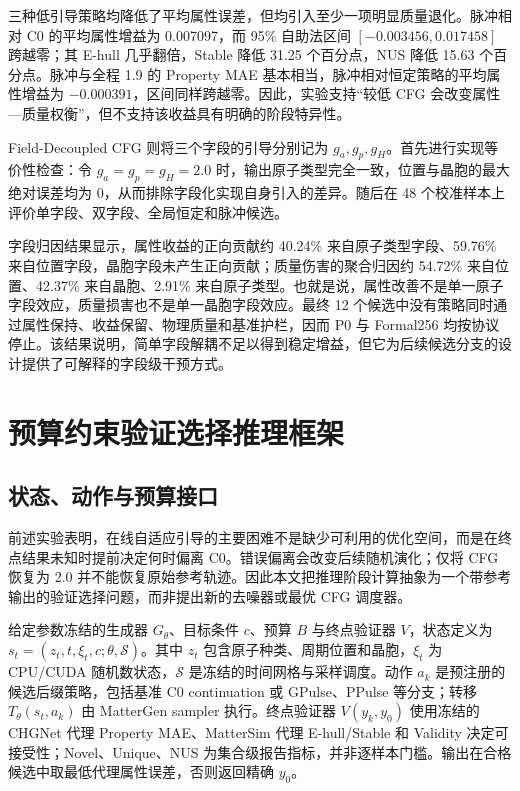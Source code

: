 三种低引导策略均降低了平均属性误差，但均引入至少一项明显质量退化。脉冲相对 C0 的平均属性增益为 0.007097，而 95\% 自助法区间 \([-0.003456,0.017458]\) 跨越零；其 E-hull 几乎翻倍，Stable 降低 31.25 个百分点，NUS 降低 15.63 个百分点。脉冲与全程 1.9 的 Property MAE 基本相当，脉冲相对恒定策略的平均属性增益为 \(-0.000391\)，区间同样跨越零。因此，实验支持``较低 CFG 会改变属性---质量权衡''，但不支持该收益具有明确的阶段特异性。

Field-Decoupled CFG 则将三个字段的引导分别记为 \(g_a,g_p,g_H\)。首先进行实现等价性检查：令 \(g_a=g_p=g_H=2.0\) 时，输出原子类型完全一致，位置与晶胞的最大绝对误差均为 0，从而排除字段化实现自身引入的差异。随后在 48 个校准样本上评价单字段、双字段、全局恒定和脉冲候选。

字段归因结果显示，属性收益的正向贡献约 40.24\% 来自原子类型字段、59.76\% 来自位置字段，晶胞字段未产生正向贡献；质量伤害的聚合归因约 54.72\% 来自位置、42.37\% 来自晶胞、2.91\% 来自原子类型。也就是说，属性改善不是单一原子字段效应，质量损害也不是单一晶胞字段效应。最终 12 个候选中没有策略同时通过属性保持、收益保留、物理质量和基准护栏，因而 P0 与 Formal256 均按协议停止。该结果说明，简单字段解耦不足以得到稳定增益，但它为后续候选分支的设计提供了可解释的字段级干预方式。

\section{预算约束验证选择推理框架}

\subsection{状态、动作与预算接口}

前述实验表明，在线自适应引导的主要困难不是缺少可利用的优化空间，而是在终点结果未知时提前决定何时偏离 C0。错误偏离会改变后续随机演化；仅将 CFG 恢复为 2.0 并不能恢复原始参考轨迹。因此本文把推理阶段计算抽象为一个带参考输出的验证选择问题，而非提出新的去噪器或最优 CFG 调度器。

给定参数冻结的生成器 $G_{\theta}$、目标条件 $c$、预算 $B$ 与终点验证器 $V$，状态定义为 $s_t=(z_t,t,\xi_t,c;\theta,\mathcal S)$。其中 $z_t$ 包含原子种类、周期位置和晶胞，$\xi_t$ 为 CPU/CUDA 随机数状态，$\mathcal S$ 是冻结的时间网格与采样调度。动作 $a_k$ 是预注册的候选后缀策略，包括基准 C0 continuation 或 GPulse、PPulse 等分支；转移 $T_{\theta}(s_t,a_k)$ 由 MatterGen sampler 执行。终点验证器 $V(y_k,y_0)$ 使用冻结的 CHGNet 代理 Property MAE、MatterSim 代理 E-hull/Stable 和 Validity 决定可接受性；Novel、Unique、NUS 为集合级报告指标，并非逐样本门槛。输出在合格候选中取最低代理属性误差，否则返回精确 $y_0$。

